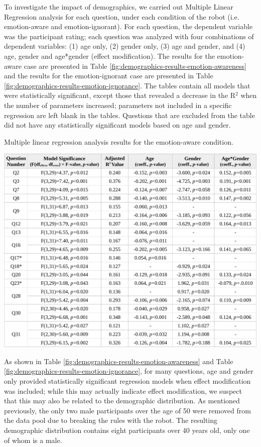 \documentclass[12pt]{report}
\begin{document}
To investigate the impact of demographics, we carried out Multiple Linear
Regression analysis for each question, under each condition of the robot (i.e.
emotion-aware and emotion-ignorant). For each question, the dependent variable
was the participant rating; each question was analyzed with four combinations of
dependent variables: (1) age only, (2) gender only, (3) age and gender, and (4)
age, gender and age*gender (effect modification). The results for the
emotion-aware case are presented in Table
\ref{fig:demographics-results-emotion-awareness} and the results for the
emotion-ignorant case are presented in Table
\ref{fig:demographics-results-emotion-ignorance}. The tables contain all models
that were statistically significant, except those that revealed a decrease in
the R$^2$ when the number of parameters increased; parameters not included in a
specific regression are left blank in the tables. Questions that are excluded
from the table did not have any statistically significant models based on age and gender.

\begin{table}[t]
  \centering
  \caption{Multiple linear regression analysis results for the emotion-aware
  condition.}
  \label{fig:demographics-results-emotion-awareness}
  \vspace*{-3mm}
  \includegraphics[width=1\textwidth]{figure/demographics-results-emotion-awareness-croped.pdf}
\end{table}

As shown in Table \ref{fig:demographics-results-emotion-awareness} and Table
\ref{fig:demographics-results-emotion-ignorance}, for many questions, age and
gender only provided statistically significant regression models when effect
modification was included; while this may actually indicate effect modification,
we suspect that this may also be related to the demographic distribution. As
mentioned previously, the only two male participants over the age of 50 were
removed from the data pool due to breaking the rules with the robot. The
resulting demographic distribution contains eight participants over 40 years
old, only one of whom is a male.
\end{document}
